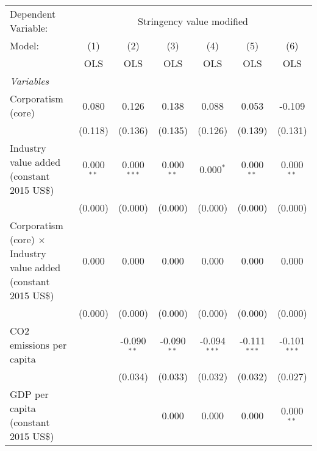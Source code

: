 
\begingroup
\centering
\begin{tabular}{lcccccc}
   \toprule
   Dependent Variable: & \multicolumn{6}{c}{Stringency value modified}\\
   Model:                                                                  & (1)          & (2)           & (3)           & (4)            & (5)            & (6)\\  
                                                                           &  OLS         & OLS           & OLS           & OLS            & OLS            & OLS\\  
   \midrule
   \emph{Variables}\\
   Corporatism (core)                                                      & 0.080        & 0.126         & 0.138         & 0.088          & 0.053          & -0.109\\   
                                                                           & (0.118)      & (0.136)       & (0.135)       & (0.126)        & (0.139)        & (0.131)\\   
   Industry value added (constant 2015 US\$)                               & 0.000$^{**}$ & 0.000$^{***}$ & 0.000$^{**}$  & 0.000$^{*}$    & 0.000$^{**}$   & 0.000$^{**}$\\   
                                                                           & (0.000)      & (0.000)       & (0.000)       & (0.000)        & (0.000)        & (0.000)\\   
   Corporatism (core) $\times$ Industry value added (constant 2015 US\$)   & 0.000        & 0.000         & 0.000         & 0.000          & 0.000          & 0.000\\   
                                                                           & (0.000)      & (0.000)       & (0.000)       & (0.000)        & (0.000)        & (0.000)\\   
   CO2 emissions per capita                                                &              & -0.090$^{**}$ & -0.090$^{**}$ & -0.094$^{***}$ & -0.111$^{***}$ & -0.101$^{***}$\\   
                                                                           &              & (0.034)       & (0.033)       & (0.032)        & (0.032)        & (0.027)\\   
   GDP per capita (constant 2015 US\$)                                     &              &               & 0.000         & 0.000          & 0.000          & 0.000$^{**}$\\   

\end{tabular}
